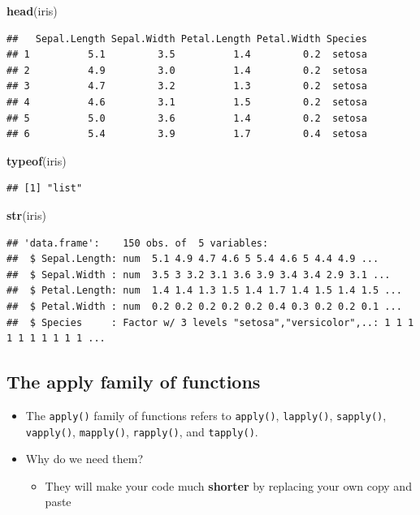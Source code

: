 \documentclass[]{book}
\newenvironment{Shaded}{\begin{snugshade}}{\end{snugshade}}
\newcommand{\KeywordTok}[1]{\textcolor[rgb]{0.13,0.29,0.53}{\textbf{#1}}}
\newcommand{\NormalTok}[1]{#1}
\providecommand{\tightlist}{%
  \setlength{\itemsep}{0pt}\setlength{\parskip}{0pt}}
\begin{document}
\begin{Shaded}
\begin{Highlighting}[]
\KeywordTok{head}\NormalTok{(iris)}
\end{Highlighting}
\end{Shaded}

\begin{verbatim}
##   Sepal.Length Sepal.Width Petal.Length Petal.Width Species
## 1          5.1         3.5          1.4         0.2  setosa
## 2          4.9         3.0          1.4         0.2  setosa
## 3          4.7         3.2          1.3         0.2  setosa
## 4          4.6         3.1          1.5         0.2  setosa
## 5          5.0         3.6          1.4         0.2  setosa
## 6          5.4         3.9          1.7         0.4  setosa
\end{verbatim}

\begin{Shaded}
\begin{Highlighting}[]
\KeywordTok{typeof}\NormalTok{(iris)}
\end{Highlighting}
\end{Shaded}

\begin{verbatim}
## [1] "list"
\end{verbatim}

\begin{Shaded}
\begin{Highlighting}[]
\KeywordTok{str}\NormalTok{(iris)}
\end{Highlighting}
\end{Shaded}

\begin{verbatim}
## 'data.frame':    150 obs. of  5 variables:
##  $ Sepal.Length: num  5.1 4.9 4.7 4.6 5 5.4 4.6 5 4.4 4.9 ...
##  $ Sepal.Width : num  3.5 3 3.2 3.1 3.6 3.9 3.4 3.4 2.9 3.1 ...
##  $ Petal.Length: num  1.4 1.4 1.3 1.5 1.4 1.7 1.4 1.5 1.4 1.5 ...
##  $ Petal.Width : num  0.2 0.2 0.2 0.2 0.2 0.4 0.3 0.2 0.2 0.1 ...
##  $ Species     : Factor w/ 3 levels "setosa","versicolor",..: 1 1 1 1 1 1 1 1 1 1 ...
\end{verbatim}

\hypertarget{the-apply-family-of-functions}{%
\subsection{The apply family of functions}\label{the-apply-family-of-functions}}

\begin{itemize}
\tightlist
\item
  The \texttt{apply()} family of functions refers to \texttt{apply()}, \texttt{lapply()}, \texttt{sapply()}, \texttt{vapply()}, \texttt{mapply()}, \texttt{rapply()}, and \texttt{tapply()}.
\item
  Why do we need them?

  \begin{itemize}
  \tightlist
  \item
    They will make your code much \textbf{shorter} by replacing your own copy and paste
  \end{itemize}
\end{itemize}
\end{document}
